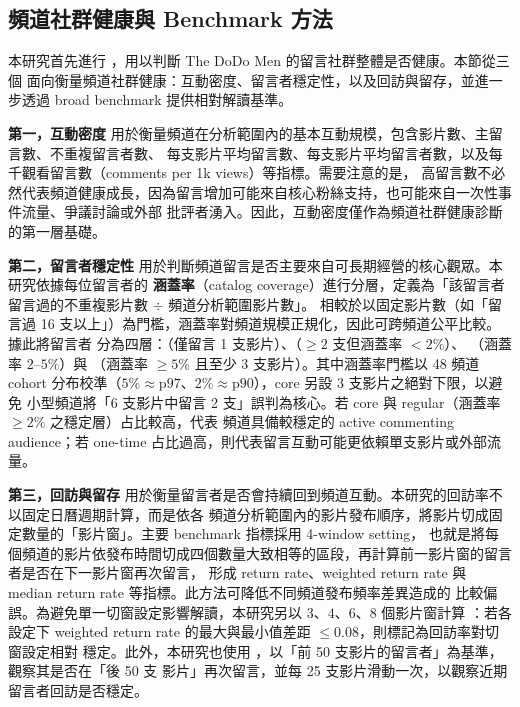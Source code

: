 \subsection{頻道社群健康與 Benchmark 方法}
\label{sec:method-health}

本研究首先進行 ，用以判斷 The DoDo Men 的留言社群整體是否健康。本節從三個
面向衡量頻道社群健康：互動密度、留言者穩定性，以及回訪與留存，並進一步透過 broad benchmark 提供相對解讀基準。

\textbf{第一，互動密度} 用於衡量頻道在分析範圍內的基本互動規模，包含影片數、主留言數、不重複留言者數、
每支影片平均留言數、每支影片平均留言者數，以及每千觀看留言數（comments per 1k views）等指標。需要注意的是，
高留言數不必然代表頻道健康成長，因為留言增加可能來自核心粉絲支持，也可能來自一次性事件流量、爭議討論或外部
批評者湧入。因此，互動密度僅作為頻道社群健康診斷的第一層基礎。

\textbf{第二，留言者穩定性} 用於判斷頻道留言是否主要來自可長期經營的核心觀眾。本研究依據每位留言者的
\textbf{涵蓋率}（catalog coverage）進行分層，定義為「該留言者留言過的不重複影片數 $\div$ 頻道分析範圍影片數」。
相較於以固定影片數（如「留言過 16 支以上」）為門檻，涵蓋率對頻道規模正規化，因此可跨頻道公平比較。據此將留言者
分為四層：（僅留言 1 支影片）、（$\ge 2$ 支但涵蓋率 $< 2\%$）、
（涵蓋率 $2$–$5\%$）與 （涵蓋率 $\ge 5\%$ 且至少 $3$ 支影片）。其中涵蓋率門檻以 48 頻道 cohort
分布校準（$5\% \approx \text{p97}$、$2\% \approx \text{p90}$），core 另設 $3$ 支影片之絕對下限，以避免
小型頻道將「6 支影片中留言 2 支」誤判為核心。若 core 與 regular（涵蓋率 $\ge 2\%$ 之穩定層）占比較高，代表
頻道具備較穩定的 active commenting audience；若 one-time 占比過高，則代表留言互動可能更依賴單支影片或外部流量。

\textbf{第三，回訪與留存} 用於衡量留言者是否會持續回到頻道互動。本研究的回訪率不以固定日曆週期計算，而是依各
頻道分析範圍內的影片發布順序，將影片切成固定數量的「影片窗」。主要 benchmark 指標採用 4-window setting，
也就是將每個頻道的影片依發布時間切成四個數量大致相等的區段，再計算前一影片窗的留言者是否在下一影片窗再次留言，
形成 return rate、weighted return rate 與 median return rate 等指標。此方法可降低不同頻道發布頻率差異造成的
比較偏誤。為避免單一切窗設定影響解讀，本研究另以 $3$、$4$、$6$、$8$ 個影片窗計算 ：若各設定下 weighted return rate 的最大與最小值差距 $\le 0.08$，則標記為回訪率對切窗設定相對
穩定。此外，本研究也使用 ，以「前 50 支影片的留言者」為基準，觀察其是否在「後 50 支
影片」再次留言，並每 25 支影片滑動一次，以觀察近期留言者回訪是否穩定。

